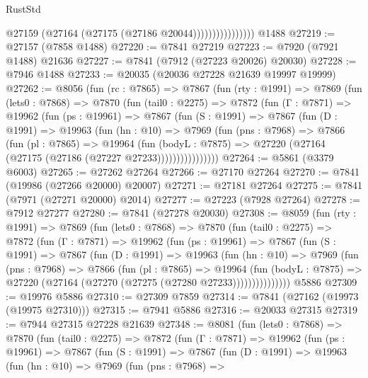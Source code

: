 \begin{lexlean}{RustStd}
\begin{coremodule}
                            @27159 (@27164 (@27175 (@27186 @20044))))))))))))))))
    @1488
@27219 := @27157 (@7858 @1488)
@27220 := @7841 @27219
@27223 := @7920 (@7921 @1488) @21636
@27227 := @7841 (@7912 (@27223 @20026) @20030)
@27228 := @7946 @1488
@27233 := @20035 (@20036 @27228 @21639 @19997 @19999)
@27262 := @8056
    (fun (rc : @7865) =>
    @7867
      (fun (rty : @1991) =>
      @7869
        (fun (lets0 : @7868) =>
        @7870
          (fun (tail0 : @2275) =>
          @7872
            (fun (Γ : @7871) =>
            @19962
              (fun (ps : @19961) =>
              @7867
                (fun (S : @1991) =>
                @7867
                  (fun (D : @1991) =>
                  @19963
                    (fun (hn : @10) =>
                    @7969
                      (fun (pns : @7968) =>
                      @7866
                        (fun (pl : @7865) =>
                        @19964
                          (fun (bodyL : @7875) =>
                          @27220 (@27164 (@27175 (@27186 (@27227 @27233))))))))))))))))
@27264 := @5861 (@3379 @6003)
@27265 := @27262 @27264
@27266 := @27170 @27264
@27270 := @7841 (@19986 (@27266 @20000) @20007)
@27271 := @27181 @27264
@27275 := @7841 (@7971 (@27271 @20000) @2014)
@27277 := @27223 (@7928 @27264)
@27278 := @7912 @27277
@27280 := @7841 (@27278 @20030)
@27308 := @8059
    (fun (rty : @1991) =>
    @7869
      (fun (lets0 : @7868) =>
      @7870
        (fun (tail0 : @2275) =>
        @7872
          (fun (Γ : @7871) =>
          @19962
            (fun (ps : @19961) =>
            @7867
              (fun (S : @1991) =>
              @7867
                (fun (D : @1991) =>
                @19963
                  (fun (hn : @10) =>
                  @7969
                    (fun (pns : @7968) =>
                    @7866
                      (fun (pl : @7865) =>
                      @19964
                        (fun (bodyL : @7875) =>
                        @27220 (@27164 (@27270 (@27275 (@27280 @27233)))))))))))))))
    @5886
@27309 := @19976 @5886
@27310 := @27309 @7859
@27314 := @7841 (@27162 (@19973 (@19975 @27310)))
@27315 := @7941 @5886
@27316 := @20033 @27315
@27319 := @7944 @27315 @27228 @21639
@27348 := @8081
    (fun (lets0 : @7868) =>
    @7870
      (fun (tail0 : @2275) =>
      @7872
        (fun (Γ : @7871) =>
        @19962
          (fun (ps : @19961) =>
          @7867
            (fun (S : @1991) =>
            @7867
              (fun (D : @1991) =>
              @19963
                (fun (hn : @10) =>
                @7969
                  (fun (pns : @7968) =>

\end{coremodule}
\end{lexlean}
